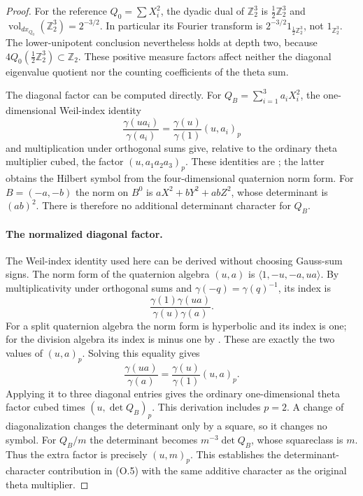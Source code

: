 \begin{proof}
For the reference $Q_0=\sum X_i^2$, the dyadic dual of
$\mathbb Z_2^3$ is $\tfrac12\mathbb Z_2^3$ and
$\operatorname{vol}_{dx_{Q_0}}(\mathbb Z_2^3)=2^{-3/2}$.
In particular its Fourier transform is
$2^{-3/2}1_{\frac12\mathbb Z_2^3}$, not $1_{\mathbb Z_2^3}$.
The lower-unipotent conclusion nevertheless holds at depth two,
because $4Q_0(\frac12\mathbb Z_2^3)\subset\mathbb Z_2$.
These positive measure factors affect neither the diagonal
eigenvalue quotient nor the counting coefficients of the theta sum.


The diagonal factor can be computed directly.  For
$Q_B=\sum_{i=1}^3 a_iX_i^2$, the one-dimensional Weil-index identity
\[
 \frac{\gamma(ua_i)}{\gamma(a_i)}
       =\frac{\gamma(u)}{\gamma(1)}(u,a_i)_p
\]
and multiplication under orthogonal sums give, relative to the
ordinary theta multiplier cubed, the factor
$(u,a_1a_2a_3)_p$.  These identities are \cite[II.25 and II.28]{weil};
the latter obtains the Hilbert symbol from the four-dimensional
quaternion norm form.  For $B=(-a,-b)$ the norm on $B^0$ is
$aX^2+bY^2+abZ^2$, whose determinant is $(ab)^2$.
There is therefore no additional determinant character for $Q_B$.
\paragraph{The normalized diagonal factor.}
The Weil-index identity used here can be derived without choosing
Gauss-sum signs. The norm form of the quaternion algebra $(u,a)$
is $\langle1,-u,-a,ua\rangle$. By multiplicativity under orthogonal
sums and $\gamma(-q)=\gamma(q)^{-1}$, its index is
\[
 \frac{\gamma(1)\gamma(ua)}{\gamma(u)\gamma(a)}.
\]
For a split quaternion algebra the norm form is hyperbolic and its
index is one; for the division algebra its index is minus one by
\cite[II.28, Proposition 4]{weil}. These are exactly the two values
of $(u,a)_p$. Solving this equality gives
\[
 \frac{\gamma(ua)}{\gamma(a)}
   =\frac{\gamma(u)}{\gamma(1)}(u,a)_p.
\]
Applying it to three diagonal entries gives the ordinary
one-dimensional theta factor cubed times $(u,\det Q_B)_p$.
This derivation includes $p=2$. A change of diagonalization changes
the determinant only by a square, so it changes no symbol.
For $Q_B/m$ the determinant becomes $m^{-3}\det Q_B$, whose
squareclass is $m$. Thus the extra factor is precisely $(u,m)_p$.
This establishes the determinant-character contribution in (O.5)
with the same additive character as the original theta multiplier.


\end{proof}
